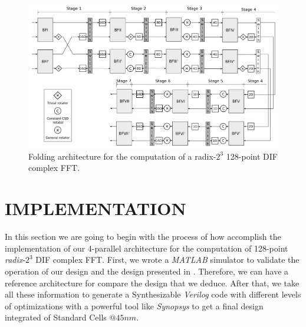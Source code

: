 \documentclass[journal,comsoc]{IEEEtran}
\begin{document}
\begin{figure}[!t]
	\centering
	\includegraphics[width=0.80\linewidth]{Diagramas/folding-128.png}
	\caption{Folding architecture for the computation of a radix-$2^3$ 128-point DIF complex FFT.}
	\label{fig:circ-folding-128}
\end{figure}



\section{IMPLEMENTATION}
In this section we are going to begin with the process of how accomplish the implementation of our 4-parallel architecture for the computation of 128-point \textit{radix}-$2^3$ DIF complex FFT.
First, we wrote a \textit{MATLAB} simulator to validate the operation of our design and the design presented in \cite{garrido_pipelined_2013,garrido_feedforward_2018}. Therefore, we can have a reference architecture for compare the design that we deduce. After that, we take all these information to generate a Synthesizable \textit{Verilog} code with different levels of optimizations with a powerful tool like \textit{Synopsys} to get a final design integrated of Standard Cells $@45nm$.
\end{document}
